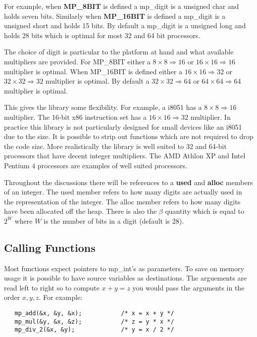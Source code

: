\documentclass{article}
\begin{document}
For example, when \textbf{MP\_8BIT} is defined a mp\_digit is a unsigned char and holds seven bits.  Similarly 
when \textbf{MP\_16BIT} is defined a mp\_digit is a unsigned short and holds 15 bits.   By default a mp\_digit is a 
unsigned long and holds 28 bits which is optimal for most 32 and 64 bit processors.

The choice of digit is particular to the platform at hand and what available multipliers are provided.  For 
MP\_8BIT either a $8 \times 8 \Rightarrow 16$ or $16 \times 16 \Rightarrow 16$ multiplier is optimal.  When 
MP\_16BIT is defined either a $16 \times 16 \Rightarrow 32$ or $32 \times 32 \Rightarrow 32$ multiplier is optimal.  By
default a $32 \times 32 \Rightarrow 64$ or $64 \times 64 \Rightarrow 64$ multiplier is optimal.  

This gives the library some flexibility.  For example, a i8051 has a $8 \times 8 \Rightarrow 16$ multiplier.  The 
16-bit x86 instruction set has a $16 \times 16 \Rightarrow 32$ multiplier.  In practice this library is not particularly
designed for small devices like an i8051 due to the size.  It is possible to strip out functions which are not required 
to drop the code size.  More realistically the library is well suited to 32 and 64-bit processors that have decent
integer multipliers.  The AMD Athlon XP and Intel Pentium 4 processors are examples of well suited processors.

Throughout the discussions there will be references to a \textbf{used} and \textbf{alloc} members of an integer.  The
used member refers to how many digits are actually used in the representation of the integer.  The alloc member refers
to how many digits have been allocated off the heap.  There is also the $\beta$ quantity which is equal to $2^W$ where 
$W$ is the number of bits in a digit (default is 28).  

\subsection{Calling Functions}
Most functions expect pointers to mp\_int's as parameters.   To save on memory usage it is possible to have source
variables as destinations.  The arguements are read left to right so to compute $x + y = z$ you would pass the arguments
in the order $x, y, z$.  For example:
\begin{verbatim}
   mp_add(&x, &y, &x);           /* x = x + y */
   mp_mul(&y, &x, &z);           /* z = y * x */
   mp_div_2(&x, &y);             /* y = x / 2 */
\end{verbatim}
\end{document}
